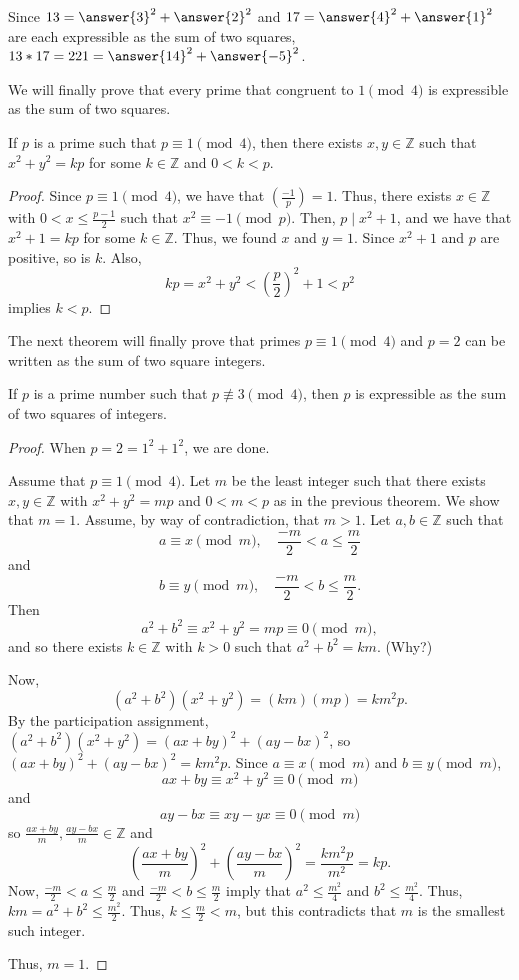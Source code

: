 \documentclass{ximera}
\begin{document}
\begin{example}
 Since $13=\answer{3}^2+\answer{2}^2$ and $17=\answer{4}^2+\answer{1}^2$ are each expressible as the sum of two squares, $13*17=221=\answer{14}^2+\answer{-5}^2$.
\end{example}

We will finally prove that every prime that congruent to $1 \pmod 4$ is expressible as the sum of two squares.

\begin{theorem}
 If $p$ is a prime such that $p\equiv 1 \pmod 4$, then there exists $x,y\in\mathbb{Z}$ such that $x^2+y^2=kp$ for some $k\in\mathbb{Z}$ and $0<k<p$.
\end{theorem}
\begin{proof}
 Since $p\equiv 1 \pmod 4$, we have that $\left(\frac{-1}{p}\right)=1$. Thus, there exists $x\in\mathbb{Z}$ with $0<x\leq\frac{p-1}{2}$ such that $x^2\equiv -1 \pmod p$. Then, $p\mid x^2+1$, and we have that $x^2+1=kp$ for some $k\in\mathbb{Z}$. Thus, we found $x$ and $y=1$. Since $x^2+1$ and $p$ are positive, so is $k$. Also, \[kp=x^2+y^2<\left(\frac{p}{2}\right)^2+1<p^2\] implies $k<p$.
\end{proof}

The next theorem will finally prove that primes $p\equiv 1 \pmod 4$ and $p=2$ can be written as the sum of two square integers.

\begin{theorem}
 If $p$ is a prime number such that $p\not\equiv 3\pmod 4$, then $p$ is expressible as the sum of two squares of integers.
\end{theorem}
\begin{proof}
 When $p=2=1^2+1^2$, we are done.
 
 Assume that $p\equiv 1\pmod 4$. Let $m$ be the least integer such that there exists $x,y\in\mathbb{Z}$ with $x^2+y^2=mp$ and $0<m<p$ as in the previous theorem. We show that $m=1$. Assume, by way of contradiction, that $m>1$. Let $a,b\in\mathbb{Z}$ such that \[a\equiv x\pmod m,\quad \frac{-m}{2}<a\leq\frac{m}{2}\] and \[b\equiv y\pmod m,\quad \frac{-m}{2}<b\leq\frac{m}{2}.\] Then \[a^2+b^2\equiv x^2+y^2=mp\equiv 0\pmod m,\] and so there exists $k\in\mathbb{Z}$ with $k>0$ such that $a^2+b^2=km$. (Why?)
 
 Now, \[(a^2+b^2)(x^2+y^2)=(km)(mp)=km^2p.\] By the participation assignment, $(a^2+b^2)(x^2+y^2)=(ax+by)^2+(ay-bx)^2$, so $(ax+by)^2+(ay-bx)^2=km^2p$. Since $a\equiv x\pmod m$ and $b\equiv y\pmod m$, \[ax+by\equiv x^2+y^2\equiv0\pmod m\] and \[ay-bx\equiv xy-yx\equiv0\pmod m\] so $\frac{ax+by}{m},\frac{ay-bx}{m}\in\mathbb{Z}$ and \[\left(\frac{ax+by}{m}\right)^2+\left(\frac{ay-bx}{m}\right)^2=\frac{km^2p}{m^2}=kp.\]  Now, $\frac{-m}{2}<a\leq\frac{m}{2}$ and $\frac{-m}{2}<b\leq\frac{m}{2}$  imply that $a^2\leq\frac{m^2}{4}$ and $b^2\leq\frac{m^2}{4}$. Thus, $km=a^2+b^2\leq\frac{m^2}{2}$. Thus, $k\leq \frac{m}{2}<m$, but this contradicts that $m$ is the smallest such integer.
 
 Thus, $m=1$.
\end{proof}
\end{document}
